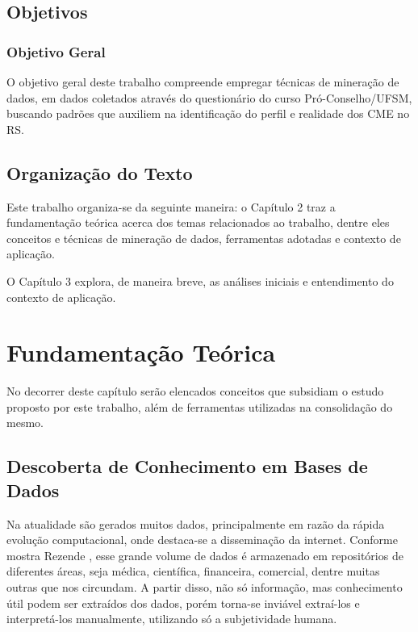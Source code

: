 \documentclass[tg]{mdtufsm}
\begin{document}
\section{Objetivos}
\subsection{Objetivo Geral}

O objetivo geral deste trabalho compreende empregar técnicas de mineração de dados, em dados coletados através do questionário do curso Pró-Conselho/UFSM, buscando padrões que auxiliem na identificação do perfil e realidade dos CME no RS.


\section{Organização do Texto}

Este trabalho organiza-se da seguinte maneira: o Capítulo 2 traz a fundamentação teórica acerca dos temas relacionados ao trabalho, dentre eles conceitos e técnicas de mineração de dados, ferramentas adotadas e contexto de aplicação.

O Capítulo 3 explora, de maneira breve, as análises iniciais e entendimento do contexto de aplicação.

\chapter{Fundamentação Teórica}

No decorrer deste capítulo serão elencados conceitos que subsidiam o estudo proposto por este trabalho, além de ferramentas utilizadas na consolidação do mesmo.

\section{Descoberta de Conhecimento em Bases de Dados}

Na atualidade são gerados muitos dados, principalmente em razão da rápida evolução computacional, onde destaca-se a disseminação da internet. Conforme mostra Rezende \citeyearpar{enia5}, esse grande volume de dados é armazenado em repositórios de diferentes áreas, seja médica, científica, financeira, comercial, dentre muitas outras que nos circundam. A partir disso, não só informação, mas conhecimento útil podem ser extraídos dos dados, porém torna-se inviável extraí-los e interpretá-los manualmente, utilizando só a subjetividade humana. 
\end{document}
